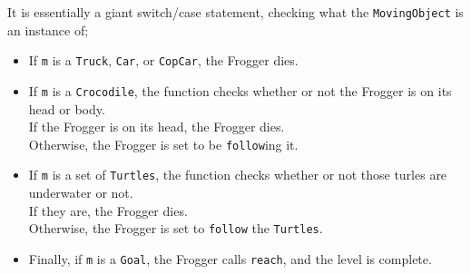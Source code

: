 \documentclass[12pt]{article}
\begin{document}
It is essentially a giant switch/case statement, checking what the \verb|MovingObject| is an instance of;
\begin{itemize}
  \item If \verb|m| is a \verb|Truck|, \verb|Car|, or \verb|CopCar|, the Frogger dies.
  \item If \verb|m| is a \verb|Crocodile|, the function checks whether or not the Frogger is on its head or body.\\
        If the Frogger is on its head, the Frogger dies.\\
        Otherwise, the Frogger is set to be \verb|follow|ing it.
  \item If \verb|m| is a set of \verb|Turtles|, the function checks whether or not those turles are underwater or not.\\
        If they are, the Frogger dies.\\
        Otherwise, the Frogger is set to \verb|follow| the \verb|Turtles|.
  \item Finally, if \verb|m| is a \verb|Goal|, the Frogger calls \verb|reach|, and the level is complete.
\end{itemize}
\end{document}
